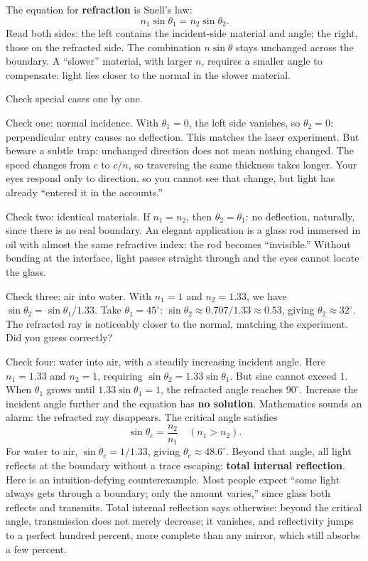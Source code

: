 The equation for \textbf{refraction} is Snell's law:
\[
n_1\sin\theta_1=n_2\sin\theta_2 .
\]
Read both sides: the left contains the incident-side material and angle; the right, those on the refracted side. The combination \(n\sin\theta\) stays unchanged across the boundary. A ``slower'' material, with larger \(n\), requires a smaller angle to compensate: light lies closer to the normal in the slower material.

Check special cases one by one.

Check one: normal incidence. With \(\theta_1=0\), the left side vanishes, so \(\theta_2=0\): perpendicular entry causes no deflection. This matches the laser experiment. But beware a subtle trap: unchanged direction does not mean nothing changed. The speed changes from \(c\) to \(c/n\), so traversing the same thickness takes longer. Your eyes respond only to direction, so you cannot see that change, but light has already ``entered it in the accounts.''

Check two: identical materials. If \(n_1=n_2\), then \(\theta_2=\theta_1\): no deflection, naturally, since there is no real boundary. An elegant application is a glass rod immersed in oil with almost the same refractive index: the rod becomes ``invisible.'' Without bending at the interface, light passes straight through and the eyes cannot locate the glass.

Check three: air into water. With \(n_1=1\) and \(n_2=1.33\), we have \(\sin\theta_2=\sin\theta_1/1.33\). Take \(\theta_1=45^\circ\): \(\sin\theta_2\approx 0.707/1.33\approx 0.53\), giving \(\theta_2\approx 32^\circ\). The refracted ray is noticeably closer to the normal, matching the experiment. Did you guess correctly?

Check four: water into air, with a steadily increasing incident angle. Here \(n_1=1.33\) and \(n_2=1\), requiring \(\sin\theta_2=1.33\sin\theta_1\). But sine cannot exceed \(1\). When \(\theta_1\) grows until \(1.33\sin\theta_1=1\), the refracted angle reaches \(90^\circ\). Increase the incident angle further and the equation has \textbf{no solution}. Mathematics sounds an alarm: the refracted ray disappears. The critical angle satisfies
\[
\sin\theta_c=\frac{n_2}{n_1}\quad(n_1>n_2).
\]
For water to air, \(\sin\theta_c=1/1.33\), giving \(\theta_c\approx 48.6^\circ\). Beyond that angle, all light reflects at the boundary without a trace escaping: \textbf{total internal reflection}. Here is an intuition-defying counterexample. Most people expect ``some light always gets through a boundary; only the amount varies,'' since glass both reflects and transmits. Total internal reflection says otherwise: beyond the critical angle, transmission does not merely decrease; it vanishes, and reflectivity jumps to a perfect hundred percent, more complete than any mirror, which still absorbs a few percent.

